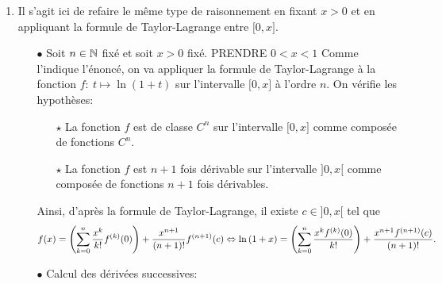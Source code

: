 \documentclass[a4paper, 11pt,reqno]{article}
\begin{document}
\begin{correction}
\begin{enumerate}
\begin{itemize}
			            Et ainsi, on obtient que
			            $$\ln{2}-S_n=\ddp\frac{f^{(n+1)}(c)}{(n+1)!}\Rightarrow \left| \ln{2}-S_n \right|=\left| \ddp\frac{f^{(n+1)}(c)}{(n+1)!} \right|=\ddp\frac{1}{(n+1) (1+c)^{n+1}}.$$
			      \item[$\bullet$]  \'Etude de la convergence de la suite $\left(S_n\right)_{n\in\N^{\star}}$:\\
			            \noindent Comme $c\in\rbrack 0,1\lbrack$, on a: $1+c>1$ et ainsi, on obtient que
			            $$\forall n\in\N,\quad \left| \ln{2}-S_n\right|\leq \ddp\frac{1}{n+1}.$$
			            Puis comme $\lim\limits_{n\to +\infty} \ddp\frac{1}{n+1}=0$ et ainsi, d'apr\`es le corollaire du th\'eor\`eme des gendarmes on sait que
			            $$\lim\limits_{n\to +\infty} S_n=\ln{(2)}\Leftrightarrow \ln{(2)}=\lim\limits_{n\to +\infty}\left( \sum\limits_{k=1}^n \ddp\frac{(-1)^{k-1}}{k} \right).$$
		      \end{itemize}
		\item Il s'agit ici de refaire le m\^eme type de raisonnement en fixant $x>0$ et en appliquant la formule de Taylor-Lagrange entre $\lbrack 0,x\rbrack$.
		      \begin{itemize}
			      \item[$\bullet$] Soit $n\in\mathbb{N}$ fix\'e et soit $x>0$ fix\'e. PRENDRE $0<x<1$
			            Comme l'indique l'\'enonc\'e, on va appliquer la formule de Taylor-Lagrange \`a la fonction $f:\ t\mapsto \ln{(1+t)}$ sur
			            l'intervalle $\lbrack 0,x\rbrack$ \`a l'ordre $n$. On v\'erifie les hypoth\`eses:
			            \begin{itemize}
				            \item[$\star$] La fonction $f$ est de classe $C^n$ sur l'intervalle $\lbrack 0,x\rbrack$ comme compos\'ee de fonctions $C^n$.
				            \item[$\star$] La fonction $f$ est $n+1$ fois d\'erivable sur l'intervalle $\rbrack 0,x\lbrack$ comme compos\'ee de fonctions $n+1$ fois d\'erivables.
			            \end{itemize}
			            Ainsi, d'apr\`es la formule de Taylor-Lagrange, il existe $c\in\rbrack 0,x\lbrack$ tel que
			            $$f(x)=\left(\sum\limits_{k=0}^n \displaystyle\frac{x^k}{k!} f^{(k)}(0)\right) +\displaystyle\frac{x^{n+1}}{(n+1)!}f^{(n+1)}(c)\Leftrightarrow
				            \ln{(1+x)}=\left(\sum\limits_{k=0}^n \displaystyle\frac{x^k f^{(k)}(0) }{k!}  \right) +\displaystyle\frac{x^{n+1} f^{(n+1)}(c)}{(n+1)!}.$$
			      \item[$\bullet$]  Calcul des d\'eriv\'ees successives:\\

\end{itemize}
\end{enumerate}
\end{correction}
\end{document}
